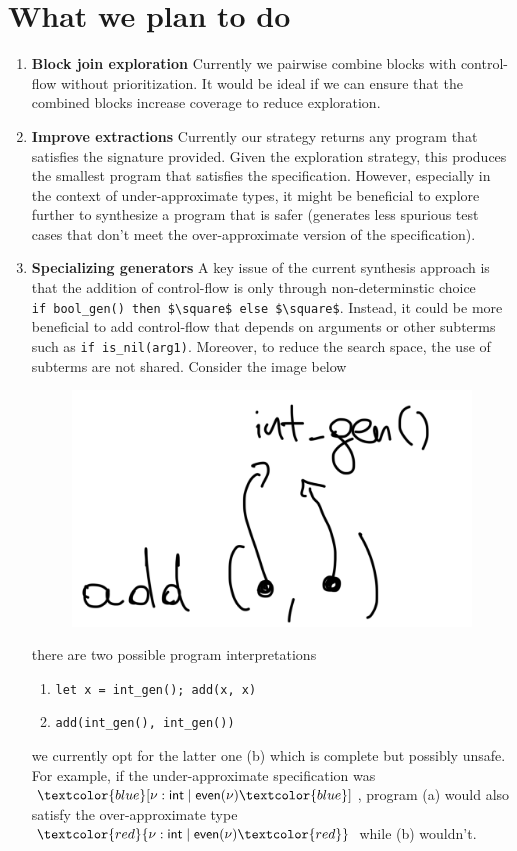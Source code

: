 \documentclass[review, sigplan]{acmart}
\begin{document}
\section*{What we plan to do}

\begin{enumerate}
    \item \textbf{Block join exploration}
    Currently we pairwise combine blocks with control-flow
    without prioritization.
    It would be ideal if we can ensure that the combined
    blocks increase coverage to reduce exploration.
    \item \textbf{Improve extractions} Currently our strategy returns any program that satisfies
    the signature provided.
    Given the exploration strategy, this produces the smallest
    program that satisfies the specification.
    However, especially in the context of under-approximate
    types, it might be beneficial to explore further to
    synthesize a program that is safer (generates less spurious
    test cases that don't meet the over-approximate version of
    the specification).
    \item \textbf{Specializing generators}
    A key issue of the current synthesis approach is that
    the addition of control-flow is only through
    non-determinstic choice \\ \lstinline{if bool_gen() then $\square$ else $\square$}.
    Instead, it could be more beneficial to add control-flow
    that depends on arguments or other subterms such as
    \texttt{if is\_nil(arg1)}.
    Moreover, to reduce the search space, the use of subterms
    are not shared. Consider the image below

    \begin{figure}[h!]
    \includegraphics[width=.2\textwidth]{img.png}
    \end{figure}

    there are two possible program interpretations
    \begin{enumerate}
        \item \texttt{let x = int\_gen(); add(x, x)}
        \item \texttt{add(int\_gen(), int\_gen())}
    \end{enumerate}
    we currently opt for the latter one (b) which is
    complete but possibly unsafe.
    For example, if the under-approximate specification was
    ${\textcolor{blue}[}\nu : \textsf{int} \mid \textsf{even}(\nu){\textcolor{blue}]}$,
    program (a) would also satisfy the over-approximate type
    ${\textcolor{red}\{}\nu : \textsf{int} \mid \textsf{even}(\nu){\textcolor{red}\}}$
    while (b) wouldn't.
\end{enumerate}
\end{document}
